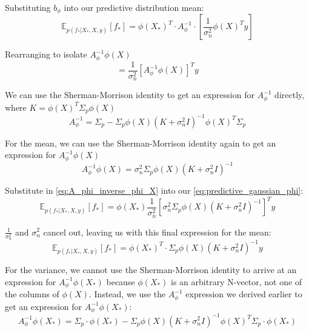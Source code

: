 Substituting $b_{\phi}$ into our predictive distribution mean:
\begin{equation*}
    \mathbb{E}_{p(f_*|X_*,X,y)}[f_*] = \phi(X_*)^T \cdot A_\phi^{-1} \cdot \left[\frac{1}{\sigma_n^2}\phi(X)^Ty\right]
\end{equation*}

Rearranging to isolate $A_\phi^{-1}\phi(X)$
\begin{equation*}
    = \frac{1}{\sigma_n^2}\left[A_{\phi}^{-1}\phi(X)\right]^Ty
\end{equation*}

We can use the Sherman-Morrison identity to get an expression for $A_{\phi}^{-1}$ directly, where $K =\phi(X)^T\Sigma_p\phi(X)$
\begin{equation*}
    A_{\phi}^{-1} = \Sigma_p - \Sigma_p\phi(X)(K+\sigma_n^2I)^{-1}\phi(X)^T\Sigma_p
\end{equation*}

For the mean, we can use the Sherman-Morrison identity again to get an expression for $A_{\phi}^{-1}\phi(X)$
\begin{equation} \label{eq:A_phi_inverse_phi_X}
    A_{\phi}^{-1}\phi(X) = \sigma_n^2\Sigma_p\phi(X)(K+\sigma_n^2I)^{-1}
\end{equation}

Substitute in \ref{eq:A_phi_inverse_phi_X} into our \ref{eq:predictive_gaussian_phi}:
\begin{equation*}
    \mathbb{E}_{p(f_*|X_*,X,y)}[f_*] = \phi(X_*) \frac{1}{\sigma_n^2}\left[\sigma_n^2\Sigma_p\phi(X)(K+\sigma_n^2I)^{-1}\right]^Ty
\end{equation*}

$\frac{1}{\sigma_n^2}$ and $\sigma_n^2$ cancel out, leaving us with this final expression for the mean:
\begin{equation} \label{eq:alt_predictive_mean_phi}
    \mathbb{E}_{p(f_*|X_*,X,y)}[f_*] = \phi(X_*)^T \cdot \Sigma_p\phi(X)(K+\sigma_n^2I)^{-1}y
\end{equation}

For the variance, we cannot use the Sherman-Morrison identity to arrive at an expression for $A_{\phi}^{-1}\phi(X_*)$ because $\phi(X_*)$ is an arbitrary N-vector, not one of the columns of $\phi(X)$. Instead, we use the $A_{\phi}^{-1}$ expression we derived earlier to get an expression for $A_{\phi}^{-1}\phi(X_*)$:
\begin{equation*}
    A_{\phi}^{-1}\phi(X_*) = \Sigma_p \cdot \phi(X_*) - \Sigma_p\phi(X)(K+\sigma_n^2I)^{-1}\phi(X)^T\Sigma_p \cdot \phi(X_*)
\end{equation*}

